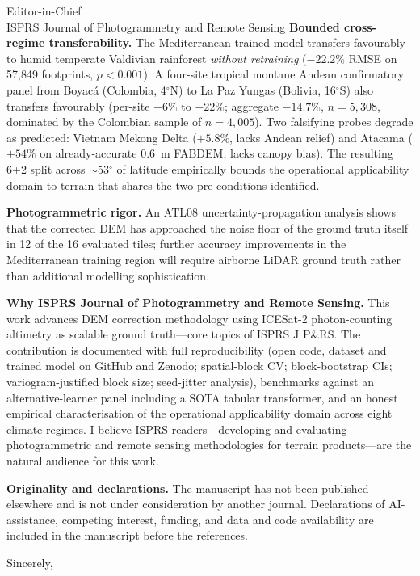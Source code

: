 \documentclass[11pt]{letter}
\begin{document}
\begin{letter}{Editor-in-Chief\\ISPRS Journal of Photogrammetry and Remote Sensing}
\textbf{Bounded cross-regime transferability.} The Mediterranean-trained model transfers favourably to humid temperate Valdivian rainforest \emph{without retraining} ($-22.2\%$ RMSE on 57{,}849 footprints, $p<0.001$). A four-site tropical montane Andean confirmatory panel from Boyac\'a (Colombia, 4$^{\circ}$N) to La Paz Yungas (Bolivia, 16$^{\circ}$S) also transfers favourably (per-site $-6\%$ to $-22\%$; aggregate $-14.7\%$, $n=5{,}308$, dominated by the Colombian sample of $n=4{,}005$). Two falsifying probes degrade as predicted: Vietnam Mekong Delta ($+5.8\%$, lacks Andean relief) and Atacama ($+54\%$ on already-accurate 0.6~m FABDEM, lacks canopy bias). The resulting 6+2 split across $\sim$53$^{\circ}$ of latitude empirically bounds the operational applicability domain to terrain that shares the two pre-conditions identified.

\textbf{Photogrammetric rigor.} An ATL08 uncertainty-propagation analysis shows that the corrected DEM has approached the noise floor of the ground truth itself in 12 of the 16 evaluated tiles; further accuracy improvements in the Mediterranean training region will require airborne LiDAR ground truth rather than additional modelling sophistication.

\textbf{Why ISPRS Journal of Photogrammetry and Remote Sensing.} This work advances DEM correction methodology using ICESat-2 photon-counting altimetry as scalable ground truth---core topics of ISPRS J P\&RS. The contribution is documented with full reproducibility (open code, dataset and trained model on GitHub and Zenodo; spatial-block CV; block-bootstrap CIs; variogram-justified block size; seed-jitter analysis), benchmarks against an alternative-learner panel including a SOTA tabular transformer, and an honest empirical characterisation of the operational applicability domain across eight climate regimes. I believe ISPRS readers---developing and evaluating photogrammetric and remote sensing methodologies for terrain products---are the natural audience for this work.

\textbf{Originality and declarations.} The manuscript has not been published elsewhere and is not under consideration by another journal. Declarations of AI-assistance, competing interest, funding, and data and code availability are included in the manuscript before the references.

\closing{Sincerely,}

\end{letter}
\end{document}
